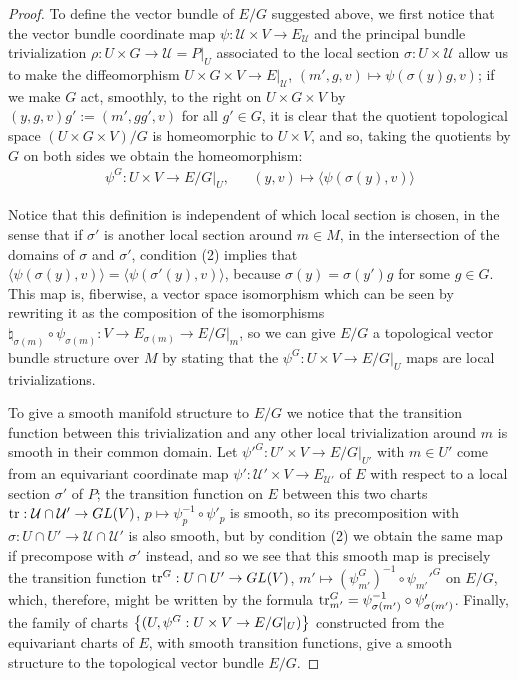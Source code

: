 \begin{proof}
To define the vector bundle of $E/G$ suggested above, we first notice that the vector bundle coordinate map $\psi:\mathcal U \times V \to E_\mathcal U$ and the principal bundle trivialization $\rho: U \times G \to \mathcal U = P|_U$ associated to the local section $\sigma: U \times \mathcal U$ allow us to make the diffeomorphism $U \times G \times V \to E|_\mathcal U$, $(m', g, v) \mapsto \psi(\sigma(y)g, v)$; if we make $G$ act, smoothly, to the right on $U \times G \times V$ by $(y, g, v)g' := (m', gg', v)$ for all $g' \in G$, it is clear that the quotient topological space $(U \times G \times V) / G$ is homeomorphic to $U \times V$, and so, taking the quotients by $G$ on both sides we obtain the homeomorphism:
\begin{align*}
    \psi^{G}: U \times V \to E/G|_{U},&& (y, v) \mapsto \langle \psi(\sigma(y), v) \rangle
\end{align*}
    
Notice that this definition is independent of which local section is chosen, in the sense that if $\sigma'$ is another local section around $m \in M$, in the intersection of the domains of $\sigma$ and $\sigma'$, condition (2) implies that $\langle \psi(\sigma(y), v) \rangle  = \langle \psi(\sigma'(y), v) \rangle$, because $\sigma(y) = \sigma(y')g$ for some $g \in G$. This map is, fiberwise, a vector space isomorphism which can be seen by rewriting it as the composition of the isomorphisms $\natural_{\sigma(m)} \circ \psi_{\sigma(m)}: V \to E_{\sigma(m)} \to E/G|_m$, so we can give $E/G$ a topological vector bundle structure over $M$ by stating that the $\psi^{G}:U \times V \to E/G|_U$ maps are local trivializations.

To give a smooth manifold structure to $E/G$ we notice that the transition function between this trivialization and any other local trivialization around $m$ is smooth in their common domain. Let $\psi'^G:U' \times V \to E/G|_{U'}$ with $m \in U'$ come from an equivariant coordinate map $\psi': \mathcal U' \times V \to E_{\mathcal U'}$ of $E$ with respect to a local section $\sigma'$ of $P$; the transition function on $E$ between this two charts $\operatorname{tr}: \mathcal U \cap \mathcal U' \to GL(V)$, $p \mapsto \psi^{-1}_p \circ \psi'_p$ is smooth, so its precomposition with $\sigma: U \cap U' \to \mathcal U \cap \mathcal U'$ is also smooth, but by condition (2) we obtain the same map if precompose with $\sigma'$ instead, and so we see that this smooth map is precisely the transition function $\operatorname{tr}^{G}: U \cap U' \to GL(V)$, $m' \mapsto (\psi_{m'}^{G})^{-1} \circ \psi_{m'}'^G$  on $E/G$, which, therefore, might be written by the formula $\operatorname{tr}^G_{m'} = \psi^{-1}_{\sigma(m')} \circ \psi'_{\sigma(m')}$. Finally, the family of charts $\left\{ (U, \psi^{G}:U \times V \to E/G|_U) \right\}$ constructed from the equivariant charts of $E$, with smooth transition functions, give a smooth structure to the topological vector bundle $E/G$.


\end{proof}
